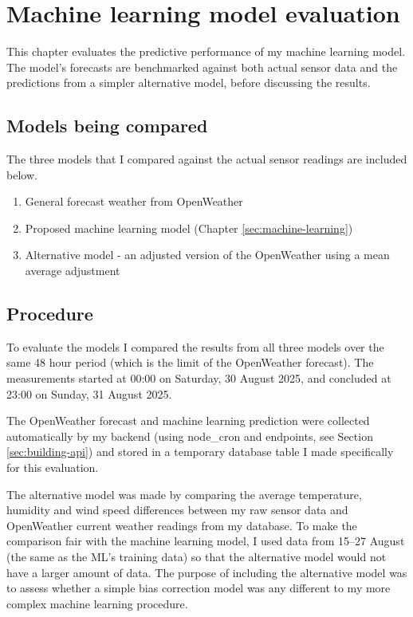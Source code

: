 \section{Machine learning model evaluation}

This chapter evaluates the predictive performance of my machine learning model.
The model's forecasts are benchmarked against both actual sensor data and the
predictions from a simpler alternative model, before discussing the results.

\subsection{Models being compared}

The three models that I compared against the actual sensor readings are included
below.

\begin{enumerate}
    \item{General forecast weather from OpenWeather} 
    \item{Proposed machine learning model (Chapter \ref{sec:machine-learning})} 
    \item{Alternative model - an adjusted version of the OpenWeather using a mean average adjustment}
\end{enumerate}

\subsection{Procedure}

To evaluate the models I compared the results from all three models over the
same 48 hour period (which is the limit of the OpenWeather forecast). The
measurements started at 00:00 on Saturday, 30 August 2025, and concluded at
23:00 on Sunday, 31 August 2025. 

The OpenWeather forecast and machine learning prediction were collected
automatically by my backend (using node\_cron and endpoints, see Section
\ref{sec:building-api}) and stored in a temporary database table I made
specifically for this evaluation.

The alternative model was made by comparing the average temperature, humidity
and wind speed differences between my raw sensor data and OpenWeather current
weather readings from my database. To make the comparison fair with the machine
learning model, I used data from 15--27 August (the same as the ML's training
data) so that the alternative model would not have a larger amount of data. The
purpose of including the alternative model was to assess whether a simple bias
correction model was any different to my more complex machine learning
procedure.


